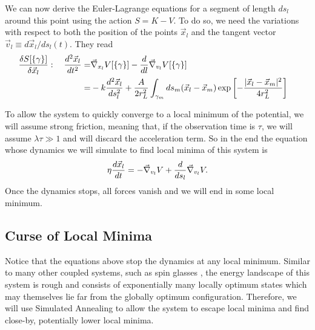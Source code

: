 \documentclass[endfloats,nofootinbib,preprint,floatfix,titlepage,superscriptaddress,linenumbers]{revtex4-1} %
\newcommand{\outNim}[1]{}
\begin{document}
\outNim{
{
\color{red} !!! Needs correction!!!}
\[K_l [\gamma_l]\equiv \int_{\gamma_l} dl \left|d^2 \vec{x}_l \over dt dl\right|^2.\]
} %

We can now derive the Euler-Lagrange equations for a segment of length $ds_l$ around this point using the action $S = K- V$. To do so, we need the variations with respect to both the position of the points $\vec{x}_l$ and the tangent vector $\vec{v}_l \equiv  d\vec{x}_l/ds_l(t)$. They read 
\begin{align} 
{\delta S[\{\gamma\}] \over \delta \vec{x}_l} : \quad {d^2 \vec{x}_l \over dt^2 }  
=&  \vec{\nabla}_{{x}_l} V[\{\gamma\}]- {d\over dl} \vec{\nabla}_{{v}_l} V[\{\gamma\}] \cr
=& -k {d^2\vec{x}_l\over ds_l^2} + {A\over 2 r_L^2}\int_{\gamma_m} ds_m
 (\vec{x}_l-\vec{x}_m)\exp\left[- {|\vec{x}_l-\vec{x}_m|^2 \over 4 r_L^2}\right]
\end{align}


To allow the system to quickly converge to a local minimum of the potential, we will assume strong friction, meaning that, if the observation time is $\tau$, we will assume $\lambda \tau \gg 1$ and will discard the acceleration term. So in the end the equation whose dynamics we will simulate to find local minima of this system is 
\begin{equation}
\eta {d \vec{x}_l \over dt }  
= - \vec{\nabla}_{{v}_l} V + {d\over ds_l} \vec{\nabla}_{{v}_l} V\label{eq:Langevin1}.
\end{equation}
Once the dynamics stops, all forces vanish and we will end in some local minimum. 


\subsection{Curse of Local Minima \label{ap:np}}
Notice that the equations above stop the dynamics at any local minimum. 
Similar to many other coupled systems, such as spin glasses \citep{parisi2002physical,pelissetto2002critical}, the energy landscape of this system is rough and consists of exponentially many locally optimum states which may themselves lie far from the globally optimum configuration. 
Therefore, we will use Simulated Annealing to allow the system to escape local minima and find close-by, potentially lower local minima.  
\end{document}
